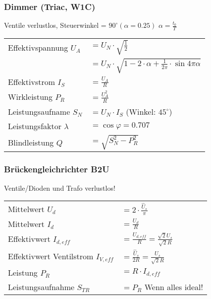 \begin{multicols}{2}
\subsubsection{Dimmer (Triac, W1C)}
Ventile verlustlos, Steuerwinkel = $90^\circ  (\alpha = 0.25)$ \newline
{} $\alpha = \frac{t_0}{T}$

 \begin{tabular}{ll}
 	Effektivspannung $U_A$		& $ = U_N \cdot \sqrt{\frac{1}{2}}$ \\
 								& $ = U_N \cdot \sqrt{1-2 \cdot \alpha +
 	\frac{1}{2\pi} \cdot \sin{4 \pi \alpha}}$\\
 	Effektivstrom $I_S$			& $ = \frac{U_A}{R}$ \\
 	Wirkleistung $P_R$			& $ = \frac{U_A^2}{R} $ \\
 	Leistungsaufname $S_N$		& $ = U_N \cdot I_S $ (Winkel: $45^\circ$) \\
 	Leistungsfaktor $\lambda$	& $ = \cos \varphi = 0.707 $\\
 	Blindleistung $Q$			& $ = \sqrt{S_N^2 -P_R^2}$\\
 \end{tabular}
 \end{multicols}
 
 \begin{multicols}{2} 
 \subsubsection{Brückengleichrichter B2U}
 Ventile/Dioden und Trafo verlustlos! \newline
 
 \begin{tabular}{ll}
 	Mittelwert $U_d$						& $ = 2 \cdot \frac{\hat{U}_s}{\pi}$ \\
 	Mittelwert $I_d$						& $ = \frac{U_d}{R}$ \\
 	Effektivwert $I_{d,eff}$				& $ = \frac{U_{d,eff}}{R} = \frac{\sqrt{2} U_s}{\sqrt{2} R}$ \\
 	Effektivwert Ventilstrom $I_{V,eff}$	& $ = \frac{\hat{U}_s}{2 R} = \frac{U_s}{\sqrt{2} R}$ \\
 	Leistung $P_R$							& $ = R \cdot I_{d,eff}$ \\
 	Leistungsaufnahme $S_{TR}$				& $ = P_R $ Wenn alles ideal!
 \end{tabular} 
 \end{multicols}
